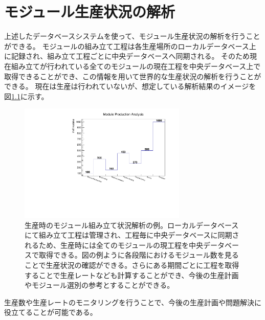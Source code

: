 \chapter{モジュール生産状況の解析}

上述したデータベースシステムを使って、モジュール生産状況の解析を行うことができる。
モジュールの組み立て工程は各生産場所のローカルデータベース上に記録され、組み立て工程ごとに中央データベースへ同期される。
そのため現在組み立てが行われている全てのモジュールの現在工程を中央データベース上で取得できることができ、この情報を用いて世界的な生産状況の解析を行うことができる。
現在は生産は行われていないが、想定している解析結果のイメージを図\ref{production_analysis}に示す。

\begin{figure}[bpt]\centering
\includegraphics[width=8cm,angle=270]{production_analysis}
\caption[生産時のモジュール組み立て状況解析の例]{生産時のモジュール組み立て状況解析の例。ローカルデータベースにて組み立て工程は管理され、工程毎に中央データベースに同期されるため、生産時には全てのモジュールの現工程を中央データベースで取得できる。図の例ように各段階におけるモジュール数を見ることで生産状況の確認ができる。さらにある期間ごとに工程を取得することで生産レートなども計算することができ、今後の生産計画やモジュール選別の参考とすることができる。}
\label{production_analysis}
\end{figure}

生産数や生産レートのモニタリングを行うことで、今後の生産計画や問題解決に役立てることが可能である。

